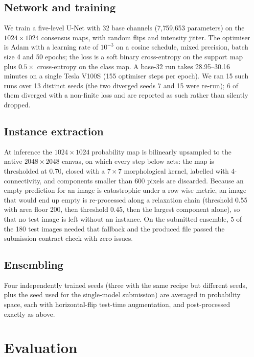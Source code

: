 \documentclass[sigconf]{acmart}
\begin{document}
\subsection{Network and training}
We train a five-level U-Net with 32 base channels (7{,}759{,}653 parameters) on
the $1024\times1024$ consensus maps, with random flips and intensity jitter.
The optimiser is Adam with a
learning rate of $10^{-3}$ on a cosine schedule, mixed precision, batch size 4
and 50 epochs; the loss is a soft binary cross-entropy on the support map plus
$0.5\times$ cross-entropy on the class map. A base-32 run takes 28.95--30.16 minutes
on a single Tesla V100S (155 optimiser steps per epoch). We ran 15 such runs
over 13 distinct seeds (the two diverged seeds 7 and 15 were re-run); 6 of
them diverged with a non-finite loss and are reported as such rather than
silently dropped.

\subsection{Instance extraction}
At inference the $1024\times1024$ probability map is bilinearly upsampled to
the native $2048\times2048$ canvas, on which every step below acts: the map is
thresholded at 0.70, closed with a
$7\times7$ morphological kernel, labelled with 4-connectivity, and components
smaller than 600 pixels are discarded. Because an empty prediction for an image
is catastrophic under a row-wise metric, an image that would end up empty is
re-processed along a relaxation chain (threshold 0.55 with area floor 200,
then threshold 0.45, then the largest component alone), so that no test image
is left without an instance. On the submitted ensemble, 5 of the 180 test
images needed that fallback and the produced file passed the submission
contract check with zero issues.

\subsection{Ensembling}
Four independently trained seeds (three with the same recipe but different
seeds, plus the seed used for the single-model submission) are averaged in
probability space, each with horizontal-flip test-time augmentation, and
post-processed exactly as above.

\section{Evaluation}
\label{sec:eval}
\end{document}
